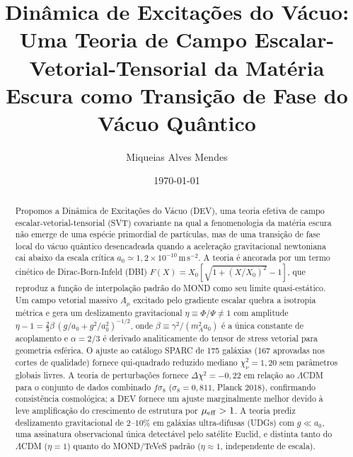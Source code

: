 \documentclass[aps,prd,twocolumn,showpacs,superscriptaddress]{revtex4-2}
\newcommand{\aO}{a_0}
\newcommand{\LCDM}{$\Lambda$CDM}
\begin{document}
\title{Dinâmica de Excitações do Vácuo: Uma Teoria de Campo
       Escalar-Vetorial-Tensorial da Matéria Escura como
       Transição de Fase do Vácuo Quântico}

\author{Miqueias Alves Mendes}

\date{\today}

\begin{abstract}
Propomos a Dinâmica de Excitações do Vácuo (DEV), uma teoria
efetiva de campo escalar-vetorial-tensorial (SVT) covariante
na qual a fenomenologia da matéria escura não emerge de uma
espécie primordial de partículas, mas de uma transição de fase
local do vácuo quântico desencadeada quando a aceleração
gravitacional newtoniana cai abaixo da escala crítica
$\aO \simeq 1{,}2\times10^{-10}$\,m\,s$^{-2}$.
A teoria é ancorada por um termo cinético de Dirac-Born-Infeld
(DBI) $F(X) = X_0[\sqrt{1+(X/X_0)^2}-1]$, que reproduz a
função de interpolação padrão do MOND como seu limite
quasi-estático.
Um campo vetorial massivo $A_\mu$ excitado pelo gradiente
escalar quebra a isotropia métrica e gera um deslizamento
gravitacional $\eta \equiv \Phi/\Psi \neq 1$ com amplitude
$\eta - 1 = \frac{2}{3}\beta\,(g/\aO+g^2/\aO^2)^{-1/2}$,
onde $\beta \equiv \gamma^2/(m_A^2 \aO)$ é a única constante
de acoplamento e $\alpha = 2/3$ é derivado analiticamente
do tensor de stress vetorial para geometria esférica.
O ajuste ao catálogo SPARC de 175 galáxias (167 aprovadas
nos cortes de qualidade) fornece qui-quadrado reduzido mediano
$\chi^2_\nu = 1{,}20$ sem parâmetros globais livres.
A teoria de perturbações fornece $\Delta\chi^2 = -0{,}22$
em relação ao \LCDM{} para o conjunto de dados combinado
$f\sigma_8$ ($\sigma_8 = 0{,}811$, Planck 2018), confirmando
consistência cosmológica; a DEV fornece um ajuste marginalmente
melhor devido à leve amplificação do crescimento de estrutura
por $\mu_{\rm eff} > 1$.
A teoria prediz deslizamento gravitacional de $2$--$10\%$
em galáxias ultra-difusas (UDGs) com $g \ll \aO$, uma
assinatura observacional única detectável pelo satélite Euclid,
e distinta tanto do \LCDM{} ($\eta=1$) quanto do MOND/TeVeS
padrão ($\eta\approx 1$, independente de escala).
\end{abstract}

\end{document}
